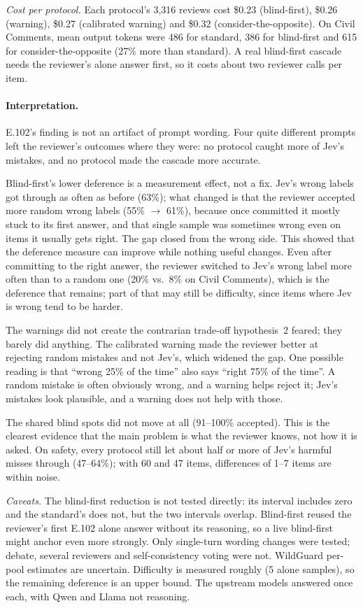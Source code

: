\documentclass[11pt]{article}
\renewcommand{\_}{\origunderscore\allowbreak}
\begin{document}
\emph{Cost per protocol.} Each protocol's 3,316 reviews cost \$0.23 (blind-first), \$0.26 (warning), \$0.27 (calibrated warning) and \$0.32 (consider-the-opposite). On Civil Comments, mean output tokens were 486 for standard, 386 for blind-first and 615 for consider-the-opposite (27\% more than standard). A real blind-first cascade needs the reviewer's alone answer first, so it costs about two reviewer calls per item.

\paragraph{Interpretation.}
E.102's finding is not an artifact of prompt wording. Four quite different prompts left the reviewer's outcomes where they were: no protocol caught more of Jev's mistakes, and no protocol made the cascade more accurate.

Blind-first's lower deference is a measurement effect, not a fix. Jev's wrong labels got through as often as before (63\%); what changed is that the reviewer accepted more random wrong labels (55\% $\rightarrow$ 61\%), because once committed it mostly stuck to its first answer, and that single sample was sometimes wrong even on items it usually gets right. The gap closed from the wrong side. This showed that the deference measure can improve while nothing useful changes. Even after committing to the right answer, the reviewer switched to Jev's wrong label more often than to a random one (20\% vs.\ 8\% on Civil Comments), which is the deference that remains; part of that may still be difficulty, since items where Jev is wrong tend to be harder.

The warnings did not create the contrarian trade-off hypothesis~2 feared; they barely did anything. The calibrated warning made the reviewer better at rejecting random mistakes and not Jev's, which widened the gap. One possible reading is that ``wrong 25\% of the time'' also says ``right 75\% of the time''. A random mistake is often obviously wrong, and a warning helps reject it; Jev's mistakes look plausible, and a warning does not help with those.

The shared blind spots did not move at all (91--100\% accepted). This is the clearest evidence that the main problem is what the reviewer knows, not how it is asked. On safety, every protocol still let about half or more of Jev's harmful misses through (47--64\%); with 60 and 47 items, differences of 1--7 items are within noise.

\emph{Caveats.} The blind-first reduction is not tested directly: its interval includes zero and the standard's does not, but the two intervals overlap. Blind-first reused the reviewer's first E.102 alone answer without its reasoning, so a live blind-first might anchor even more strongly. Only single-turn wording changes were tested; debate, several reviewers and self-consistency voting were not. WildGuard per-pool estimates are uncertain. Difficulty is measured roughly (5 alone samples), so the remaining deference is an upper bound. The upstream models answered once each, with Qwen and Llama not reasoning.
\end{document}
